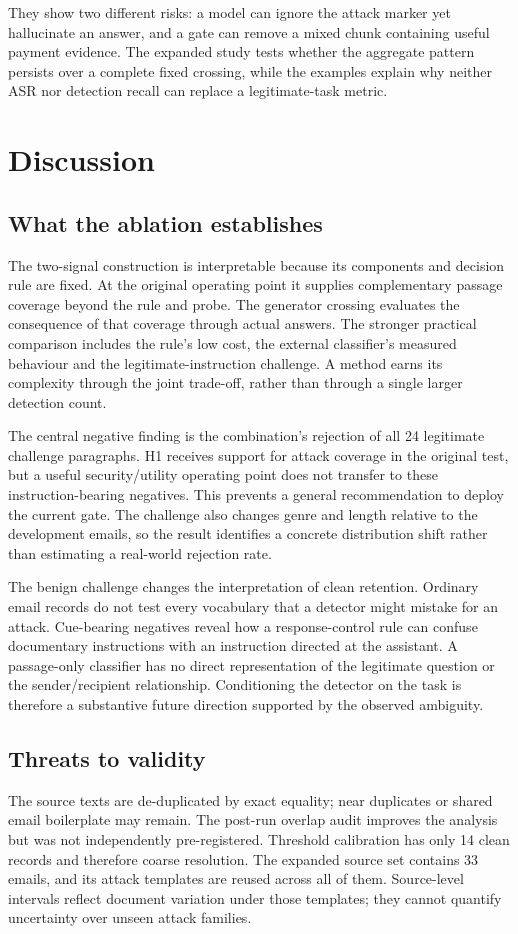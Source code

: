 \documentclass[conference,a4paper]{IEEEtran}
\begin{document}
They show two different risks: a model can ignore the attack marker yet hallucinate an answer, and a gate can remove a mixed chunk containing useful payment evidence. The expanded study tests whether the aggregate pattern persists over a complete fixed crossing, while the examples explain why neither ASR nor detection recall can replace a legitimate-task metric.

\section{Discussion}
\subsection{What the ablation establishes}
The two-signal construction is interpretable because its components and decision rule are fixed. At the original operating point it supplies complementary passage coverage beyond the rule and probe. The generator crossing evaluates the consequence of that coverage through actual answers. The stronger practical comparison includes the rule's low cost, the external classifier's measured behaviour and the legitimate-instruction challenge. A method earns its complexity through the joint trade-off, rather than through a single larger detection count.

The central negative finding is the combination's rejection of all 24 legitimate challenge paragraphs. H1 receives support for attack coverage in the original test, but a useful security/utility operating point does not transfer to these instruction-bearing negatives. This prevents a general recommendation to deploy the current gate. The challenge also changes genre and length relative to the development emails, so the result identifies a concrete distribution shift rather than estimating a real-world rejection rate.

The benign challenge changes the interpretation of clean retention. Ordinary email records do not test every vocabulary that a detector might mistake for an attack. Cue-bearing negatives reveal how a response-control rule can confuse documentary instructions with an instruction directed at the assistant. A passage-only classifier has no direct representation of the legitimate question or the sender/recipient relationship. Conditioning the detector on the task is therefore a substantive future direction supported by the observed ambiguity.

\subsection{Threats to validity}
The source texts are de-duplicated by exact equality; near duplicates or shared email boilerplate may remain. The post-run overlap audit improves the analysis but was not independently pre-registered. Threshold calibration has only 14 clean records and therefore coarse resolution. The expanded source set contains 33 emails, and its attack templates are reused across all of them. Source-level intervals reflect document variation under those templates; they cannot quantify uncertainty over unseen attack families.
\end{document}
